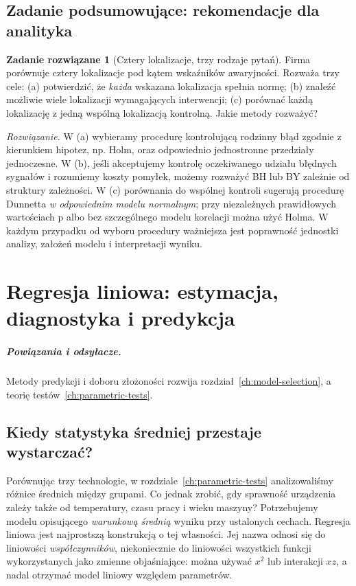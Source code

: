 \documentclass[11pt,a4paper,oneside]{report}
\numberwithin{equation}{chapter}
\theoremstyle{plain}
\theoremstyle{definition}
\newtheorem{zadanie}{Zadanie rozwiązane}[chapter]
\theoremstyle{remark}
\begin{document}
\section{Zadanie podsumowujące: rekomendacje dla analityka}
\begin{zadanie}[Cztery lokalizacje, trzy rodzaje pytań]
Firma porównuje cztery lokalizacje pod kątem wskaźników
awaryjności. Rozważa trzy cele: (a) potwierdzić, że
\emph{każda} wskazana lokalizacja spełnia normę;
(b) znaleźć możliwie wiele lokalizacji wymagających
interwencji; (c) porównać każdą lokalizację z jedną
wspólną lokalizacją kontrolną. Jakie metody rozważyć?
\par\emph{Rozwiązanie.} W (a) wybieramy procedurę
kontrolującą rodzinny błąd zgodnie z kierunkiem hipotez,
np. Holm, oraz odpowiednio jednostronne przedziały
jednoczesne. W (b), jeśli akceptujemy kontrolę
oczekiwanego udziału błędnych sygnałów i rozumiemy
koszty pomyłek, możemy rozważyć BH lub BY zależnie od
struktury zależności. W (c) porównania do wspólnej
kontroli sugerują procedurę Dunnetta \emph{w odpowiednim
modelu normalnym}; przy niezależnych prawidłowych
wartościach p albo bez szczególnego modelu korelacji
można użyć Holma. W każdym przypadku od wyboru
procedury ważniejsza jest poprawność jednostki analizy,
założeń modelu i interpretacji wyniku.
\end{zadanie}



\chapter{Regresja liniowa: estymacja, diagnostyka i predykcja}
\label{ch:linear-regression}
\paragraph{Powiązania i odsyłacze.} Metody predykcji i doboru złożoności rozwija rozdział~\ref{ch:model-selection}, a teorię testów~\ref{ch:parametric-tests}.


\section{Kiedy statystyka średniej przestaje wystarczać?}
Porównując trzy technologie, w rozdziale~\ref{ch:parametric-tests}
analizowaliśmy różnice średnich między grupami. Co jednak zrobić, gdy
sprawność urządzenia zależy także od temperatury, czasu pracy i wieku
maszyny? Potrzebujemy modelu opisującego \emph{warunkową średnią}
wyniku przy ustalonych cechach. Regresja liniowa jest najprostszą
konstrukcją o tej własności. Jej nazwa odnosi się do liniowości
\emph{współczynników}, niekoniecznie do liniowości wszystkich funkcji
wykorzystanych jako zmienne objaśniające: można używać $x^2$ lub
interakcji $xz$, a nadal otrzymać model liniowy względem parametrów.
\end{document}
